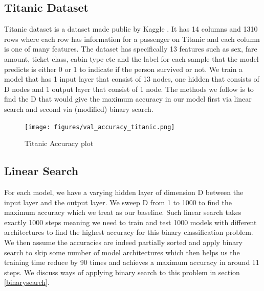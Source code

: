 \documentclass[conference]{IEEEtran}
\begin{document}
\subsection{Titanic Dataset}
Titanic dataset is a dataset made public by Kaggle \cite{titanickaggledataset}. It has 14 columns and 1310 rows where each row has information for a passenger on Titanic and each column is one of many features. The dataset has specifically 13 features such as sex, fare amount, ticket class, cabin type etc and the label for each sample that the model predicts is either 0 or 1 to indicate if the person survived or not. We train a model that has 1 input layer that consist of 13 nodes, one hidden that consists of D nodes and 1 output layer that consist of 1 node. The methods we follow is to find the D that would give the maximum accuracy in our model first via linear search and second via (modified) binary search. 

\begin{figure}[H]
    \centering
    \texttt{[image: figures/val\_accuracy\_titanic.png]}
    \caption{Titanic Accuracy plot}
    \label{fig:titanic_accuracy}
\end{figure}


\subsection{Linear Search} \label{linearsearch}
For each model, we have a varying hidden layer of dimension D between the input layer and the output layer. We sweep D from 1 to 1000 to find the maximum accuracy which we treat as our baseline. Such linear search takes exactly 1000 steps meaning we need to train and test 1000 models with different architectures to find the highest accuracy for this binary classification problem. We then assume the accuracies are indeed partially sorted and apply binary search to skip some number of model architectures which then helps us the training time reduce by 90 times and achieves a maximum accuracy in around 11 steps. We discuss ways of applying binary search to this problem in section \ref{binarysearch}.
\end{document}
